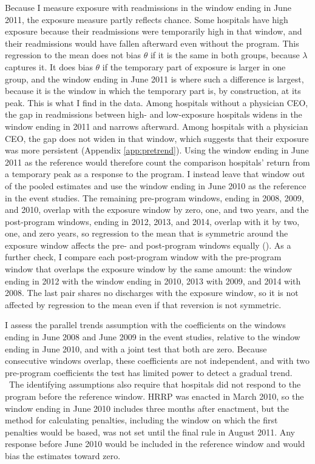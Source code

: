 \documentclass[12pt]{article}
\theoremstyle{definition}   %
\begin{document}
Because I measure exposure with readmissions in the window ending in June 2011, the exposure measure partly reflects chance. Some hospitals have high exposure because their readmissions were temporarily high in that window, and their readmissions would have fallen afterward even without the program. This regression to the mean does not bias $\theta$ if it is the same in both groups, because $\lambda$ captures it. It does bias $\theta$ if the temporary part of exposure is larger in one group, and the window ending in June 2011 is where such a difference is largest, because it is the window in which the temporary part is, by construction, at its peak. This is what I find in the data. Among hospitals without a physician CEO, the gap in readmissions between high- and low-exposure hospitals widens in the window ending in 2011 and narrows afterward. Among hospitals with a physician CEO, the gap does not widen in that window, which suggests that their exposure was more persistent (Appendix \ref{app:pretrend}). Using the window ending in June 2011 as the reference would therefore count the comparison hospitals' return from a temporary peak as a response to the program. I instead leave that window out of the pooled estimates and use the window ending in June 2010 as the reference in the event studies. The remaining pre-program windows, ending in 2008, 2009, and 2010, overlap with the exposure window by zero, one, and two years, and the post-program windows, ending in 2012, 2013, and 2014, overlap with it by two, one, and zero years, so regression to the mean that is symmetric around the exposure window affects the pre- and post-program windows equally (\cite{chabe2015analysis}). As a further check, I compare each post-program window with the pre-program window that overlaps the exposure window by the same amount: the window ending in 2012 with the window ending in 2010, 2013 with 2009, and 2014 with 2008. The last pair shares no discharges with the exposure window, so it is not affected by regression to the mean even if that reversion is not symmetric.

I assess the parallel trends assumption with the coefficients on the windows ending in June 2008 and June 2009 in the event studies, relative to the window ending in June 2010, and with a joint test that both are zero. Because consecutive windows overlap, these coefficients are not independent, and with two pre-program coefficients the test has limited power to detect a gradual trend.
\ The identifying assumptions also require that hospitals did not respond to the program before the reference window. HRRP was enacted in March 2010, so the window ending in June 2010 includes three months after enactment, but the method for calculating penalties, including the window on which the first penalties would be based, was not set until the final rule in August 2011. Any response before June 2010 would be included in the reference window and would bias the estimates toward zero.
\end{document}
